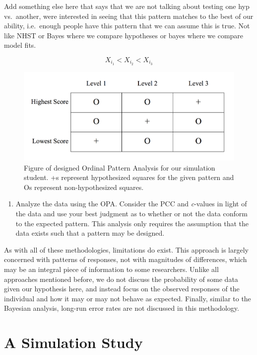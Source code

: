 \documentclass[english,man]{apa6}
\providecommand{\tightlist}{%
  \setlength{\itemsep}{0pt}\setlength{\parskip}{0pt}}
\theoremstyle{definition}
\theoremstyle{definition}
\theoremstyle{definition}
\theoremstyle{remark}
\begin{document}
Add something else here that says that we are not talking about testing
one hyp vs.~another, were interested in seeing that this pattern matches
to the best of our ability, i.e.~enough people have this pattern that we
can assume this is true. Not like NHST or Bayes where we compare
hypotheses or bayes where we compare model fits.

\[
  X_{i_1} < X_{i_2} < X_{i_3}   
\]

\begin{figure}
\includegraphics[width=4.91in]{oom_pic} \caption{Figure of designed Ordinal Pattern Analysis for our simulation student. +s represent hypothesized squares for the given pattern and Os represent non-hypothesized squares.}\label{fig:oom-pic}
\end{figure}

\begin{enumerate}
\def\labelenumi{\arabic{enumi})}
\setcounter{enumi}{1}
\tightlist
\item
  Analyze the data using the OPA. Consider the PCC and \emph{c}-values
  in light of the data and use your best judgment as to whether or not
  the data conform to the expected pattern. This analysis only requires
  the assumption that the data exists such that a pattern may be
  designed.
\end{enumerate}

As with all of these methodologies, limitations do exist. This approach
is largely concerned with patterns of responses, not with magnitudes of
differences, which may be an integral piece of information to some
researchers. Unlike all approaches mentioned before, we do not discuss
the probability of some data given our hypothesis here, and instead
focus on the observed responses of the individual and how it may or may
not behave as expected. Finally, similar to the Bayesian analysis,
long-run error rates are not discussed in this methodology.

\section{A Simulation Study}\label{a-simulation-study}
\end{document}
